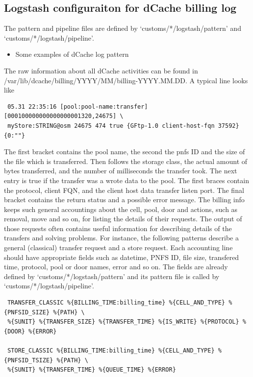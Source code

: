 \documentclass[]{article}
\begin{document}
\subsection{Logstash configuraiton for dCache billing
log}\label{logstash-configuraiton-for-dcache-billing-log}

The pattern and pipeline files are defined by
`customs/*/logstash/pattern' and `customs/*/logstash/pipeline'.

\begin{itemize}
\itemsep1pt\parskip0pt
\item
  Some examples of dCache log pattern
\end{itemize}

The raw information about all dCache activities can be found in
/var/lib/dcache/billing/YYYY/MM/billing-YYYY.MM.DD. A typical line looks
like

\begin{verbatim}
 05.31 22:35:16 [pool:pool-name:transfer] [000100000000000000001320,24675] \
 myStore:STRING@osm 24675 474 true {GFtp-1.0 client-host-fqn 37592} {0:""}
\end{verbatim}

The first bracket contains the pool name, the second the pnfs ID and the
size of the file which is transferred. Then follows the storage class,
the actual amount of bytes transferred, and the number of milliseconds
the transfer took. The next entry is true if the transfer was a wrote
data to the pool. The first braces contain the protocol, client FQN, and
the client host data transfer listen port. The final bracket contains
the return status and a possible error message. The billing info keeps
such general accountings about the cell, pool, door and actions, such as
removal, move and so on, for listing the details of their requests. The
output of those requests often contains useful information for
describing details of the transfers and solving problems. For instance,
the following patterns describe a general (classical) transfer request
and a store request. Each accounting line should have appropriate fields
such as datetime, PNFS ID, file size, transfered time, protocol, pool or
door names, error and so on. The fields are already defined by
`customs/*/logstash/pattern' and its pattern file is called by
`customs/*/logstash/pipeline'.

\begin{verbatim}
 TRANSFER_CLASSIC %{BILLING_TIME:billing_time} %{CELL_AND_TYPE} %{PNFSID_SIZE} %{PATH} \
 %{SUNIT} %{TRANSFER_SIZE} %{TRANSFER_TIME} %{IS_WRITE} %{PROTOCOL} %{DOOR} %{ERROR}

 STORE_CLASSIC %{BILLING_TIME:billing_time} %{CELL_AND_TYPE} %{PNFSID_TSIZE} %{PATH} \
 %{SUNIT} %{TRANSFER_TIME} %{QUEUE_TIME} %{ERROR}
\end{verbatim}
\end{document}
